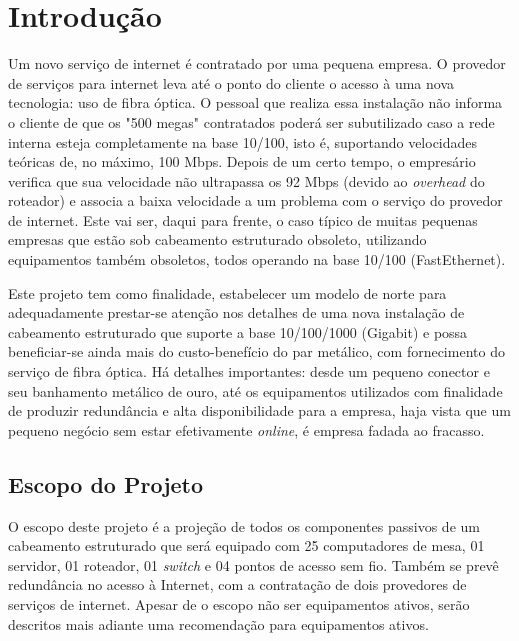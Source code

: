 \documentclass[	DIV=calc,%
							paper=a4,%
							fontsize=12pt,%
							onecolumn]{scrartcl}	 					%
\begin{document}
\renewcommand*\listtablename{Lista de tabelas}
\listoftables




\clearpage
\renewcommand{\contentsname}{Sumário}
\tableofcontents
\clearpage

\section{Introdução}

Um novo serviço de internet é contratado por uma pequena empresa. O provedor de serviços para internet leva até o ponto do cliente o acesso à uma nova tecnologia: uso de fibra óptica. O pessoal que realiza essa instalação não informa o cliente de que os "500 megas" contratados poderá ser subutilizado caso a rede interna esteja completamente na base 10/100, isto é, suportando velocidades teóricas de, no máximo, 100 Mbps. Depois de um certo tempo, o empresário verifica que sua velocidade não ultrapassa os 92 Mbps (devido ao \textit{overhead} do roteador) e associa a baixa velocidade a um problema com o serviço do provedor de internet. Este vai ser, daqui para frente, o caso típico de muitas pequenas empresas que estão sob cabeamento estruturado obsoleto, utilizando equipamentos também obsoletos, todos operando na base 10/100 (FastEthernet).
\bigskip

Este projeto tem como finalidade, estabelecer um modelo de norte para adequadamente prestar-se atenção nos detalhes de uma nova instalação de cabeamento estruturado que suporte a base 10/100/1000 (Gigabit) e possa beneficiar-se ainda mais do custo-benefício do par metálico, com fornecimento do serviço de fibra óptica. Há detalhes importantes: desde um pequeno conector e seu banhamento metálico de ouro, até os equipamentos utilizados com finalidade de produzir redundância e alta disponibilidade para a empresa, haja vista que um pequeno negócio sem estar efetivamente \textit{online}, é empresa fadada ao fracasso.
\bigskip

\subsection{Escopo do Projeto}
O escopo deste projeto é a projeção de todos os componentes passivos de um cabeamento estruturado que será equipado com 25 computadores de mesa, 01 servidor, 01 roteador, 01 \textit{switch} e 04 pontos de acesso sem fio. Também se prevê redundância no acesso à Internet, com a contratação de dois provedores de serviços de internet. Apesar de o escopo não ser equipamentos ativos, serão descritos mais adiante uma recomendação para equipamentos ativos.
\end{document}
